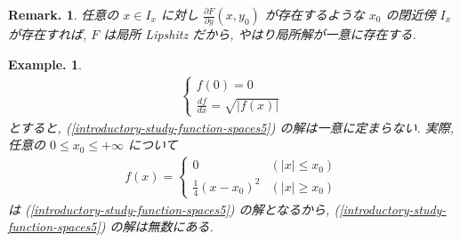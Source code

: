 \documentclass[openany, a4paper, oneside]{jsbook}
\theoremstyle{break}
\theoremstyle{breakdefn}
\newtheorem{ex}[thm]{Example.}
\newtheorem{rem}[thm]{Remark.}
\newcommand{\abs}[1]{\left|#1\right|}
\begin{document}
\begin{rem}
任意の $x \in I_x$ に対し $\frac{\partial F}{\partial y}(x, y_0)$ が存在するような
$x_0$ の閉近傍 $I_x$ が存在すれば, $F$ は局所 Lipshitz だから, やはり局所解が一意に存在する.
\end{rem}
\begin{ex}
\begin{align}
 \begin{cases}
  f(0)
  =
  0 \\
  \frac{df}{dx}
  =
  \sqrt{\abs{f(x)}}
 \end{cases}\label{introductory-study-function-spaces5}
\end{align}
とすると, (\ref{introductory-study-function-spaces5}) の解は一意に定まらない.
実際, 任意の $0 \leq x_0 \leq + \infty$ について
\begin{align*}
 f(x)
 =
 \begin{cases}
  0 & (|x|\leq x_0) \\
  \frac{1}{4}(x - x_0)^2 & (|x|\geq x_0)
 \end{cases}
\end{align*}
は (\ref{introductory-study-function-spaces5}) の解となるから, (\ref{introductory-study-function-spaces5}) の解は無数にある.
\end{ex}
\end{document}
